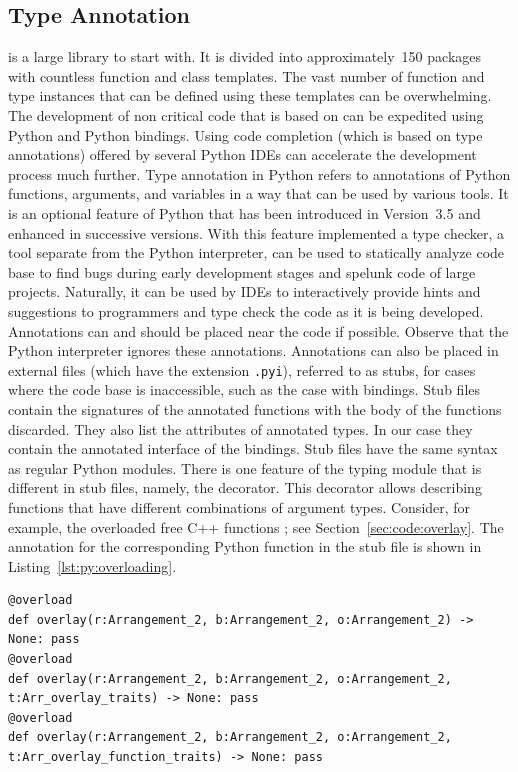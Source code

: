 \subsection{Type Annotation}
\label{ssec:concepts:annotation}
\cgal{} is a large library to start with. It is divided into
approximately~150 packages with countless function and class
templates. The vast number of function and type instances that can be
defined using these templates can be overwhelming. The development of
non critical code that is based on \cgal{} can be expedited using
Python and \cgal{} Python bindings.  Using code completion (which is
based on type annotations) offered by several Python IDEs can
accelerate the development process much further. Type annotation in
Python refers to annotations of Python functions, arguments, and
variables in a way that can be used by various tools. It is an
optional feature of Python that has been introduced in Version~3.5 and
enhanced in successive versions. With this feature implemented a type
checker, a tool separate from the Python interpreter, can be used to
statically analyze code base to find bugs during early development
stages and spelunk code of large projects. Naturally, it can be used
by IDEs to interactively provide hints and suggestions to programmers
and type check the code as it is being developed. Annotations can and
should be placed near the code if possible. Observe that the Python
interpreter ignores these annotations. Annotations can also be placed
in external files (which have the extension \lstinline{.pyi}),
referred to as stubs, for cases where the code base is inaccessible,
such as the case with bindings. Stub files contain the signatures of
the annotated functions with the body of the functions discarded. They
also list the attributes of annotated types. In our case they contain
the annotated interface of the \cgal{} bindings. Stub files have the
same syntax as regular Python modules. There is one feature of the
typing module that is different in stub files, namely, the
 decorator. This decorator allows describing
functions that have different combinations of argument types.
Consider, for example, the overloaded free C++ functions
; see Section~\ref{sec:code:overlay}. The
annotation for the corresponding Python function
 in the stub file is shown in
Listing~\ref{lst:py:overloading}.

\begin{lstfloat}
\begin{lstlisting}[style=pythonFramedStyle,basicstyle=\normalsize,%
                   label={lst:py:overloading},%
                   caption={Type annotation of the overloaded overlay function.}]
@overload
def overlay(r:Arrangement_2, b:Arrangement_2, o:Arrangement_2) -> None: pass
@overload
def overlay(r:Arrangement_2, b:Arrangement_2, o:Arrangement_2, t:Arr_overlay_traits) -> None: pass
@overload
def overlay(r:Arrangement_2, b:Arrangement_2, o:Arrangement_2, t:Arr_overlay_function_traits) -> None: pass
\end{lstlisting}
\end{lstfloat}


